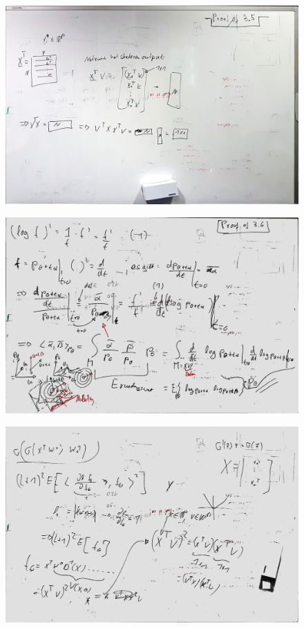 \documentclass[a4paper]{article}
\begin{document}
\begin{figure}
	\centering
	\includegraphics[width=\textwidth]{whiteboard_notes/10.jpg}
\end{figure}

\begin{figure}
	\centering
	\includegraphics[width=\textwidth]{whiteboard_notes/11.jpg}
\end{figure}

\begin{figure}
	\centering
	\includegraphics[width=\textwidth]{whiteboard_notes/12.jpg}
\end{figure}
\end{document}
